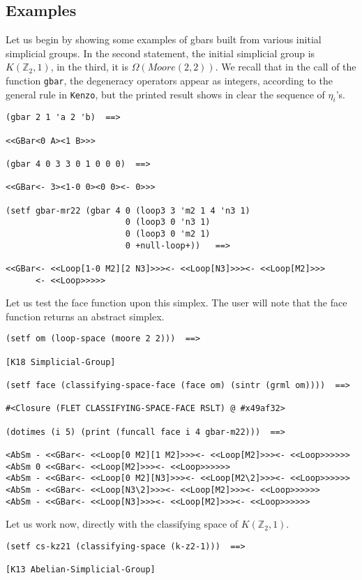 \subsection* {Examples}

Let us begin by showing some examples of gbars built  from various
initial simplicial groups. In the second statement, the initial simplicial group
is $K(\mathbb{Z}_2, 1)$, in the third, it is $\Omega({\mathit Moore}(2,2))$. We recall that
in the call of the function {\tt gbar}, the degeneracy operators appear as integers,
according to the general rule in {\tt Kenzo}, but the printed result shows in clear
the sequence of $\eta_i$'s.
{\footnotesize\begin{verbatim}
(gbar 2 1 'a 2 'b)  ==>

<<GBar<0 A><1 B>>>

(gbar 4 0 3 3 0 1 0 0 0)  ==>

<<GBar<- 3><1-0 0><0 0><- 0>>>

(setf gbar-mr22 (gbar 4 0 (loop3 3 'm2 1 4 'n3 1)
                        0 (loop3 0 'n3 1)
                        0 (loop3 0 'm2 1)
                        0 +null-loop+))   ==>

<<GBar<- <<Loop[1-0 M2][2 N3]>>><- <<Loop[N3]>>><- <<Loop[M2]>>>
      <- <<Loop>>>>>
\end{verbatim}}
Let us test the face function upon this simplex. The user will note
that the face function returns an abstract simplex.
{\footnotesize\begin{verbatim}
(setf om (loop-space (moore 2 2)))  ==>

[K18 Simplicial-Group]

(setf face (classifying-space-face (face om) (sintr (grml om))))  ==>

#<Closure (FLET CLASSIFYING-SPACE-FACE RSLT) @ #x49af32>

(dotimes (i 5) (print (funcall face i 4 gbar-m22)))  ==>

<AbSm - <<GBar<- <<Loop[0 M2][1 M2]>>><- <<Loop[M2]>>><- <<Loop>>>>>>
<AbSm 0 <<GBar<- <<Loop[M2]>>><- <<Loop>>>>>>
<AbSm - <<GBar<- <<Loop[0 M2][N3]>>><- <<Loop[M2\2]>>><- <<Loop>>>>>>
<AbSm - <<GBar<- <<Loop[N3\2]>>><- <<Loop[M2]>>><- <<Loop>>>>>>
<AbSm - <<GBar<- <<Loop[N3]>>><- <<Loop[M2]>>><- <<Loop>>>>>>
\end{verbatim}}
Let us work now, directly with the classifying space of $K(\mathbb{Z}_2, 1)$.
{\footnotesize\begin{verbatim}
(setf cs-kz21 (classifying-space (k-z2-1)))  ==>

[K13 Abelian-Simplicial-Group]
\end{verbatim}}
